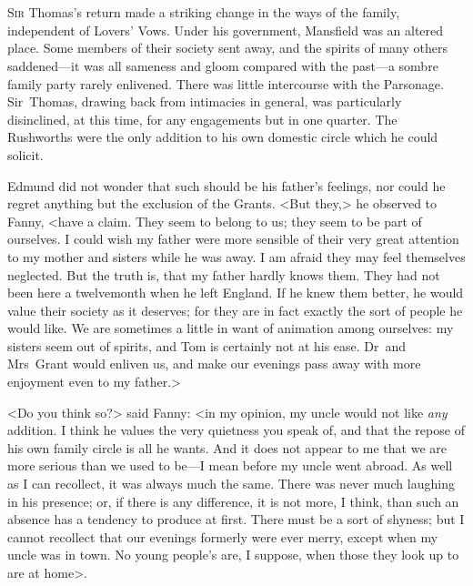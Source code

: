 \chapter[Chapter \thechapter]{} 

 \lettrine[lraise=0.3]{S}{ir} Thomas's return made a striking change in the ways of the family, independent of Lovers' Vows. Under his government, Mansfield was an altered place. Some members of their society sent away, and the spirits of many others saddened—it was all sameness and gloom compared with the past—a sombre family party rarely enlivened. There was little intercourse with the Parsonage. Sir~Thomas, drawing back from intimacies in general, was particularly disinclined, at this time, for any engagements but in one quarter. The Rushworths were the only addition to his own domestic circle which he could solicit.

Edmund did not wonder that such should be his father's feelings, nor could he regret anything but the exclusion of the Grants. <But they,> he observed to Fanny, <have a claim. They seem to belong to us; they seem to be part of ourselves. I could wish my father were more sensible of their very great attention to my mother and sisters while he was away. I am afraid they may feel themselves neglected. But the truth is, that my father hardly knows them. They had not been here a twelvemonth when he left England. If he knew them better, he would value their society as it deserves; for they are in fact exactly the sort of people he would like. We are sometimes a little in want of animation among ourselves: my sisters seem out of spirits, and Tom is certainly not at his ease. Dr~and Mrs~Grant would enliven us, and make our evenings pass away with more enjoyment even to my father.>

<Do you think so?> said Fanny: <in my opinion, my uncle would not like \textit{any}  addition. I think he values the very quietness you speak of, and that the repose of his own family circle is all he wants. And it does not appear to me that we are more serious than we used to be—I mean before my uncle went abroad. As well as I can recollect, it was always much the same. There was never much laughing in his presence; or, if there is any difference, it is not more, I think, than such an absence has a tendency to produce at first. There must be a sort of shyness; but I cannot recollect that our evenings formerly were ever merry, except when my uncle was in town. No young people's are, I suppose, when those they look up to are at home>.

